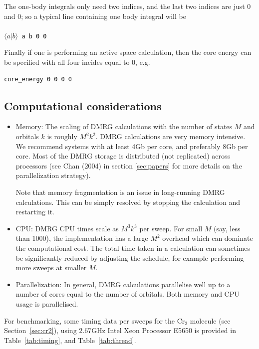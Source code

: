 \documentclass[letterpaper,12pt,aps, pra]{revtex4-1}
\begin{document}
The one-body integrals only need two indices, and the last two indices are just 0 and 0; so a typical line containing one body integral will be\\
\texttt{
\\$\langle a|b\rangle$ a b 0 0\\}

Finally if one is performing an active space calculation, then the core energy can be specified with all four incides equal to 0, e.g.
\begin{verbatim}
core_energy 0 0 0 0
\end{verbatim}

\subsection{Computational considerations}\label{sec:computation}

\begin{itemize}
\item Memory: The scaling of DMRG calculations with the number of states $M$ and orbitals $k$ is roughly $M^2 k^2$.
DMRG calculations are very memory intensive. We recommend systems with at least 4Gb per core, and preferably 8Gb per core. Most
of the DMRG storage is distributed (not replicated) across processors (see Chan (2004) in section \ref{sec:papers} for more details
on the parallelization strategy).

Note that memory fragmentation is an issue in long-running DMRG calculations. This can be simply resolved by stopping the calculation and restarting it.
\item CPU: DMRG CPU times scale as $M^3 k^3$ per sweep. For small $M$ (say, less than 1000), the implementation has a
large $M^2$ overhead which can dominate the computational cost. The total time taken in a calculation can sometimes
be significantly reduced by adjusting the schedule, for example performing more sweeps at smaller $M$.
\item Parallelization: In general, DMRG calculations parallelise well up to a number of cores equal to the number of orbitals. Both
memory and CPU usage is parallelised.
\end{itemize}

For benchmarking, some timing data per sweeps for the Cr$_2$ molecule (see
Section~\ref{sec:cr2}), using 2.67GHz Intel Xeon Processor E5650 is provided in
Table~\ref{tab:timing}, and Table~\ref{tab:thread}.
\end{document}
